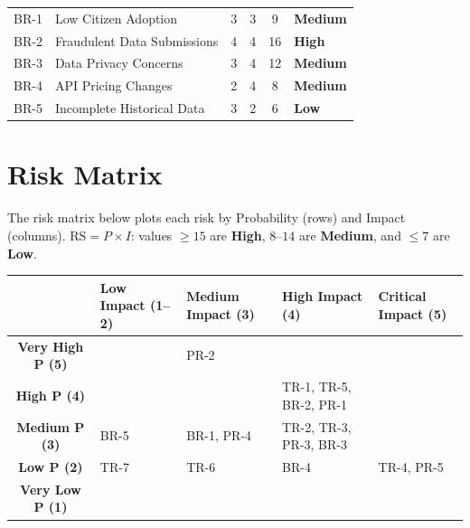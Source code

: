 \documentclass[12pt,a4paper]{article}
\begin{document}
\begin{center}
\begin{tabular}{c l c c c l}
\rowcolor{medRisk!20}
BR-1 & Low Citizen Adoption & 3 & 3 & 9 & \textbf{\color{medRisk}Medium} \\
\rowcolor{highRisk!20}
BR-2 & Fraudulent Data Submissions & 4 & 4 & 16 & \textbf{\color{highRisk}High} \\
\rowcolor{medRisk!20}
BR-3 & Data Privacy Concerns & 3 & 4 & 12 & \textbf{\color{medRisk}Medium} \\
\rowcolor{medRisk!20}
BR-4 & API Pricing Changes & 2 & 4 & 8 & \textbf{\color{medRisk}Medium} \\
\rowcolor{lowRisk!20}
BR-5 & Incomplete Historical Data & 3 & 2 & 6 & \textbf{\color{lowRisk}Low} \\
\bottomrule
\end{tabular}
\end{center}

\section{Risk Matrix}

The risk matrix below plots each risk by Probability (rows) and Impact (columns). $\text{RS} = P \times I$: values $\geq 15$ are \textcolor{highRisk}{\textbf{High}}, $8$--$14$ are \textcolor{medRisk}{\textbf{Medium}}, and $\leq 7$ are \textcolor{lowRisk}{\textbf{Low}}.

\bigskip
\begin{center}
\renewcommand{\arraystretch}{1.6}
\begin{tabular}{c | >{\centering\arraybackslash}m{2.8cm} | >{\centering\arraybackslash}m{2.8cm} | >{\centering\arraybackslash}m{2.8cm} | >{\centering\arraybackslash}m{2.8cm}}
 & \textbf{Low Impact (1--2)} & \textbf{Medium Impact (3)} & \textbf{High Impact (4)} & \textbf{Critical Impact (5)} \\
\hline
\textbf{Very High P (5)} & \cellcolor{medRisk!30} & \cellcolor{highRisk!30} PR-2 & \cellcolor{highRisk!30} & \cellcolor{highRisk!30} \\
\hline
\textbf{High P (4)} & \cellcolor{medRisk!30} & \cellcolor{highRisk!30} & \cellcolor{highRisk!30} TR-1, TR-5, BR-2, PR-1 & \cellcolor{highRisk!30} \\
\hline
\textbf{Medium P (3)} & \cellcolor{lowRisk!30} BR-5 & \cellcolor{medRisk!30} BR-1, PR-4 & \cellcolor{medRisk!30} TR-2, TR-3, PR-3, BR-3 & \cellcolor{medRisk!30} \\
\hline
\textbf{Low P (2)} & \cellcolor{lowRisk!30} TR-7 & \cellcolor{lowRisk!30} TR-6 & \cellcolor{medRisk!30} BR-4 & \cellcolor{medRisk!30} TR-4, PR-5 \\
\hline
\textbf{Very Low P (1)} & \cellcolor{lowRisk!30} & \cellcolor{lowRisk!30} & \cellcolor{lowRisk!30} & \cellcolor{lowRisk!30} \\
\hline
\end{tabular}
\end{center}
\end{document}
